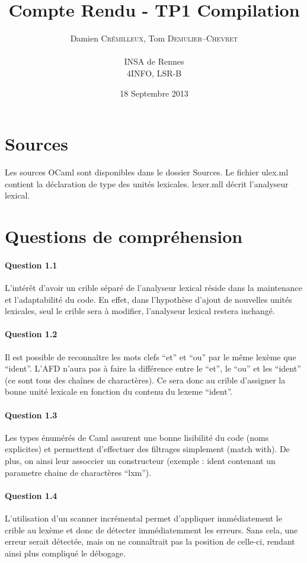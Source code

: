 \documentclass[a4paper]{article}
\author{
  Damien \textsc{Crémilleux}, Tom \textsc{Demulier--Chevret} \\ \\
  INSA de Rennes \\
  4INFO, LSR-B
}
\title{Compte Rendu - TP1 Compilation}
\date{18 Septembre 2013}
\begin{document}
\maketitle

\section{Sources}

Les sources OCaml sont disponibles dans le dossier Sources. Le fichier ulex.ml contient la déclaration de type des unités lexicales. lexer.mll décrit l'analyseur lexical.

\section{Questions de compréhension}

\paragraph{Question 1.1} L'intérêt d'avoir un crible séparé de l'analyseur lexical réside dans la maintenance et l'adaptabilité du code.
En effet, dans l'hypothèse d'ajout de nouvelles unités lexicales, seul le crible sera à modifier, l'analyseur lexical restera inchangé.

\paragraph{Question 1.2} Il est possible de reconnaître les mots clefs ``et'' et ``ou'' par le même lexème que ``ident''.
L'AFD n'aura pas à faire la différence entre le ``et'', le ``ou'' et les ``ident'' (ce sont tous des chaînes de charactères).
Ce sera donc au crible d'assigner la bonne unité lexicale en fonction du contenu du lexeme ``ident''. 

\paragraph{Question 1.3} Les types énumérés de Caml assurent une bonne lisibilité du code (noms explicites) et permettent d'effectuer des filtrages simplement (match with).
De plus, on ainsi leur assoccier un constructeur (exemple : ident contenant un parametre chaine de charactères ``lxm'').

\paragraph{Question 1.4} L'utilisation d'un scanner incrémental permet d'appliquer immédiatement le crible au lexème et donc de détecter immédiatemment les erreurs.
Sans cela, une erreur serait détectée, mais on ne connaîtrait pas la position de celle-ci, rendant ainsi plus compliqué le débogage.
\end{document}
